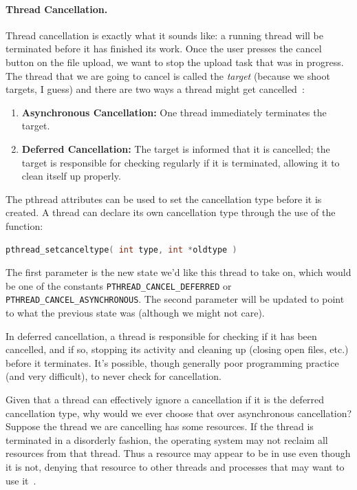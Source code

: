 \paragraph{Thread Cancellation.}
Thread cancellation is exactly what it sounds like: a running thread will be terminated before it has finished its work. Once the user presses the cancel button on the file upload, we want to stop the upload task that was in progress. The thread that we are going to cancel is called the \textit{target} (because we shoot targets, I guess) and there are two ways a thread might get cancelled~\cite{osc}:

\begin{enumerate}
	\item \textbf{Asynchronous Cancellation:} One thread immediately terminates the target.
	\item \textbf{Deferred Cancellation:} The target is informed that it is cancelled; the target is responsible for checking regularly if it is terminated, allowing it to clean itself up properly. 
\end{enumerate}

The pthread attributes can be used to set the cancellation type before it is created. A thread can declare its own cancellation type through the use of the function:
\begin{lstlisting}[language=C]
pthread_setcanceltype( int type, int *oldtype )
\end{lstlisting}

The first parameter is the new state we'd like this thread to take on, which would be one of the constants \texttt{PTHREAD\_CANCEL\_DEFERRED} or \texttt{PTHREAD\_CANCEL\_ASYNCHRONOUS}. The second parameter will be updated to point to what the previous state was (although we might not care).

In deferred cancellation, a thread is responsible for checking if it has been cancelled, and if so, stopping its activity and cleaning up (closing open files, etc.) before it terminates. It's possible, though generally poor programming practice (and very difficult), to never check for cancellation.

Given that a thread can effectively ignore a cancellation if it is the deferred cancellation type, why would we ever choose that over asynchronous cancellation? Suppose the thread we are cancelling has some resources. If the thread is terminated in a disorderly fashion, the operating system may not reclaim all resources from that thread. Thus a resource may appear to be in use even though it is not, denying that resource to other threads and processes that may want to use it~\cite{osc}.


